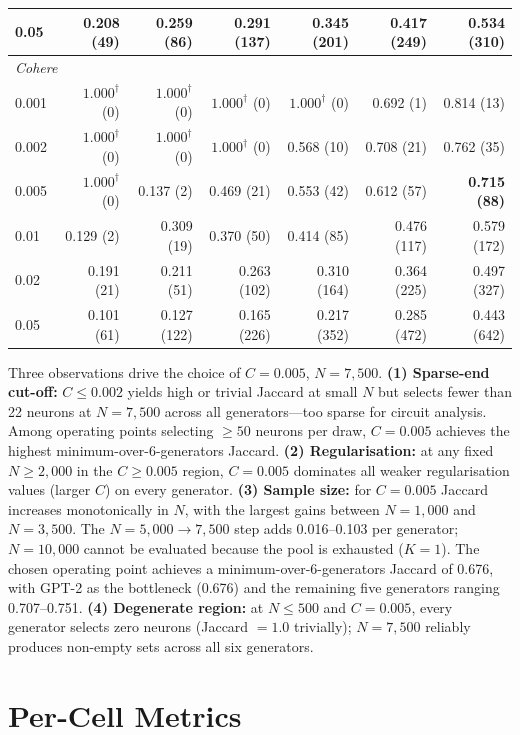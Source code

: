 \documentclass[11pt]{article}
\begin{document}
\begin{table}[!htbp]
\begin{tabular}{lrrrrrr}
0.05  & 0.208 (49)  & 0.259 (86)  & 0.291 (137) & 0.345 (201) & 0.417 (249) & 0.534 (310) \\
\midrule
\multicolumn{7}{l}{\textit{Cohere}} \\
0.001 & $1.000^\dagger$ (0)  & $1.000^\dagger$ (0)  & $1.000^\dagger$ (0)  & $1.000^\dagger$ (0)  & 0.692 (1)   & 0.814 (13) \\
0.002 & $1.000^\dagger$ (0)  & $1.000^\dagger$ (0)  & $1.000^\dagger$ (0)  & 0.568 (10)  & 0.708 (21)  & 0.762 (35) \\
0.005 & $1.000^\dagger$ (0)  & 0.137 (2)   & 0.469 (21)  & 0.553 (42)  & 0.612 (57)  & \textbf{0.715 (88)} \\
0.01  & 0.129 (2)   & 0.309 (19)  & 0.370 (50)  & 0.414 (85)  & 0.476 (117) & 0.579 (172) \\
0.02  & 0.191 (21)  & 0.211 (51)  & 0.263 (102) & 0.310 (164) & 0.364 (225) & 0.497 (327) \\
0.05  & 0.101 (61)  & 0.127 (122) & 0.165 (226) & 0.217 (352) & 0.285 (472) & 0.443 (642) \\
\bottomrule
\end{tabular}
\end{table}

Three observations drive the choice of $C=0.005$, $N=7{,}500$. \textbf{(1) Sparse-end cut-off:} $C \leq 0.002$ yields high or trivial Jaccard at small $N$ but selects fewer than 22 neurons at $N=7{,}500$ across all generators---too sparse for circuit analysis. Among operating points selecting $\geq 50$ neurons per draw, $C=0.005$ achieves the highest minimum-over-6-generators Jaccard. \textbf{(2) Regularisation:} at any fixed $N \geq 2{,}000$ in the $C \geq 0.005$ region, $C=0.005$ dominates all weaker regularisation values (larger $C$) on every generator. \textbf{(3) Sample size:} for $C=0.005$ Jaccard increases monotonically in $N$, with the largest gains between $N=1{,}000$ and $N=3{,}500$. The $N=5{,}000 \to 7{,}500$ step adds 0.016--0.103 per generator; $N=10{,}000$ cannot be evaluated because the pool is exhausted ($K=1$). The chosen operating point achieves a minimum-over-6-generators Jaccard of 0.676, with GPT-2 as the bottleneck (0.676) and the remaining five generators ranging 0.707--0.751. \textbf{(4) Degenerate region:} at $N \leq 500$ and $C=0.005$, every generator selects zero neurons (Jaccard $=1.0$ trivially); $N=7{,}500$ reliably produces non-empty sets across all six generators.

\section{Per-Cell Metrics}
\label{app:per-cell}
\end{document}

